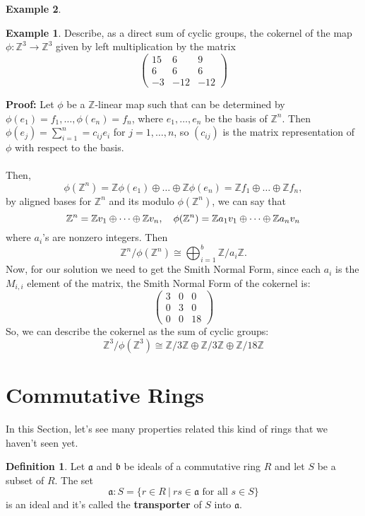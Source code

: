 \documentclass[11pt]{amsbook}%
\theoremstyle{plain}
\theoremstyle{definition}
\newtheorem{definition*}{Definition}
\newtheorem*{example*}{Example}
\numberwithin{equation}{section}
\newcommand{\af}{\mathfrak a}
\newcommand{\bff}{\mathfrak b}
\renewcommand{\proof}{ \textbf{Proof: }}
\begin{document}
\begin{example*}
\begin{example*}
  Describe, as a direct sum of cyclic groups, the cokernel of the map
  $\phi: \mathbb{Z}^{3} \longrightarrow \mathbb{Z}^{3}$ given by left multiplication by the matrix
  $$
\left(\begin{matrix} 15 & 6 & 9 \\ 6 & 6 & 6 \\ -3 & -12 & -12 \end{matrix}\right)
$$
\end{example*}
\proof  Let $\phi$ be a $\mathbb{Z}$-linear map such that can be determined by $\phi(e_{1}) = f_{1}, \dots,  \phi(e_{n}) = f_{n}$, where $e_{1}, \dots, e_{n}$ be the basis of $\mathbb{Z}^{n}$. Then $\phi(e_{j}) = \sum_{i=1}^{n} = c_{ij}e_{i}$ for $j = 1, \dots, n$, so $(c_{ij})$ is the matrix representation of $\phi$ with respect to the basis. \\ \\
Then,
  $$
  \phi(\mathbb{Z}^{n}) = \mathbb{Z}\phi(e_{1}) \oplus \dots \oplus \mathbb{Z}\phi(e_{n}) = \mathbb{Z}f_{1} \oplus \dots \oplus \mathbb{Z}f_{n},
  $$
  by aligned bases for $\mathbb{Z}^{n}$ and its modulo $\phi(\mathbb{Z}^{n})$, we can say that
  $$
  \mathbb{Z}^{n} = \mathbb{Z}v_{1} \oplus \dots \oplus \mathbb{Z}v_{n}, \hspace{1 em} \phi(\mathbb{Z}^{n}) = \mathbb{Z}a_{1}v_{1} \oplus \dots \oplus \mathbb{Z}a_{n}v_{n}
  $$
  where $a_{i}$'s are nonzero integers. Then
  $$
  \mathbb{Z}^{n}/\phi(\mathbb{Z}^{n}) \cong \bigoplus_{i=1}^{b} \mathbb{Z}/a_{i}\mathbb{Z}.
  $$
  Now, for our solution we need to get the Smith Normal Form, since each $a_{i}$ is the $M_{i,i}$ element of the matrix, the Smith Normal Form of the cokernel is:
  $$
  \left(\begin{matrix}
      3 & 0 & 0 \\
      0 & 3 & 0 \\
      0 & 0 & 18
  \end{matrix}\right)
  $$
  So, we can describe the cokernel as the sum of cyclic groups:
  $$
  \mathbb{Z}^{3}/\phi(\mathbb{Z}^{3}) \cong  \mathbb{Z}/3\mathbb{Z} \oplus \mathbb{Z}/3\mathbb{Z} \oplus \mathbb{Z}/18\mathbb{Z}
  $$ \qedsymbol


\section{Commutative Rings}
In this Section, let's see many properties related this kind of rings that we haven't seen yet.
\begin{definition*}
  \label{def-transporter}
  Let $\af$ and $\bff$ be ideals of a commutative ring $R$ and let $S$ be a subset of $R$. The set
  $$
  \af:S = \{r \in R \ | \ rs \in \af \text{ for all } s \in S\}
  $$
  is an ideal and it's called the \textbf{transporter} of $S$ into $\af$.
\end{definition*}


\end{example*}
\end{document}
